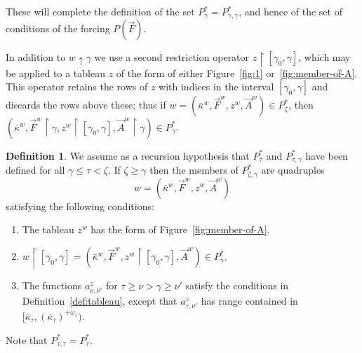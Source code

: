 \documentclass[
twoside,
]{article}
\theoremstyle{definition}
\newtheorem{definition}[theorem]{Definition}
\theoremstyle{remark}
\newcommand{\forceKappa}{\bar\kappa} %
\newcommand{\scutdown}{{\uparrow}}
\newcommand{\restrict}{{\upharpoonright}}
\begin{document}
These will complete the definition of the set
$P^*_{\gamma}=P^*_{\gamma,\gamma}$, and hence of the set of conditions
of the forcing $P(\vec F)$.

In addition to $w\scutdown\gamma$ we use a second  restriction operator
$z\restrict[\gamma_0,\gamma]$, which may be applied to a tableau $z$
of the form of either Figure~\ref{fig:1} or~\ref{fig:member-of-A}.
This operator retains the rows of $z$ with indices in the interval
$[\gamma_0,\gamma]$ and discards the rows above these; thus if
$w=(\forceKappa^{w},\vec F^{w},z^{w},\vec A^{w})\in P^*_{\zeta}$, then 
$(\forceKappa^w,\vec F^{w}\restrict\gamma,
z^{w}\restrict[\gamma_0,\gamma], \vec A^{w}\restrict\gamma)\in P^*_{\gamma}$.

\begin{definition}
  \label{def:A}
  We assume as a recursion hypothesis that $P^{*}_{\tau}$ and
  $P^{*}_{\tau,\gamma}$
  have been defined for all
  $\gamma\le\tau<\zeta$.  
  If $\zeta\geq\gamma$ then 
  the members of $P^{*}_{\zeta,\gamma}$ are quadruples
  \begin{equation}
    w=(\forceKappa^{w},\vec F^{w}, z^{w}, \vec A^{w})\label{eq:c}
  \end{equation}
  satisfying the following conditions:
  \begin{enumerate}
  \item The tableau $z^w$ has the form of Figure~\ref{fig:member-of-A}.
  \item $w\restrict[\gamma_0,\gamma]=(\forceKappa^{w},\vec
    F^{w},z^{w}\restrict[\gamma_0,\gamma],\vec A^{w}) \in P^*_{\gamma}$.
  \item The functions $a^{z}_{\nu,\nu'}$ for $\tau\geq\nu>\gamma\geq\nu'$
    satisfy the conditions in Definition~\ref{def:tableau}, except
    that $a^{z}_{\tau,\nu'}$ has range contained in
    $[\forceKappa_\tau,(\forceKappa_\tau)^{+\omega_1})$.
  \end{enumerate}

Note that $P^*_{\tau,\tau}=P^{*}_{\tau}$.


\end{definition}
\end{document}
